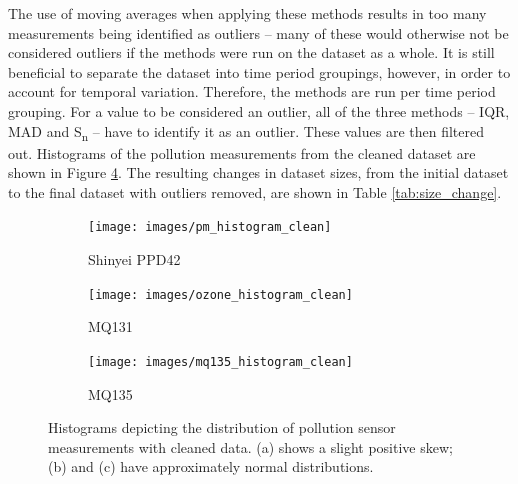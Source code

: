\documentclass[11pt]{report}
\begin{document}
The use of moving averages when applying these methods results in too many measurements being identified as outliers -- many of these would otherwise not be considered outliers if the methods were run on the dataset as a whole. It is still beneficial to separate the dataset into time period groupings, however, in order to account for temporal variation. Therefore, the methods are run per time period grouping. For a value to be considered an outlier, all of the three methods -- IQR, MAD and S\textsubscript{n} -- have to identify it as an outlier. These values are then filtered out. Histograms of the pollution measurements from the cleaned dataset are shown in Figure \ref{fig:histograms_clean}. The resulting changes in dataset sizes, from the initial dataset to the final dataset with outliers removed, are shown in Table \ref{tab:size_change}.

\begin{figure}[!tbp]
    \centering
    \begin{minipage}{1\linewidth}
            \begin{subfigure}[t]{.5\linewidth}
                \texttt{[image: images/pm\_histogram\_clean]}
                \caption{Shinyei PPD42}
                \label{fig:pm_histogram_clean}
            \end{subfigure}
            \begin{subfigure}[t]{.5\linewidth}
            	\texttt{[image: images/ozone\_histogram\_clean]}
            	\caption{MQ131}
            	\label{fig:ozone_histogram_clean}
	   \end{subfigure}
        \end{minipage}
    \begin{minipage}{1\linewidth}
            \begin{subfigure}[t]{.5\linewidth}
                \texttt{[image: images/mq135\_histogram\_clean]}
                \caption{MQ135}
                \label{fig:mq135_histogram_clean}
            \end{subfigure}
    \end{minipage}
    \caption[Sensor measurement histograms with cleaned data.]{Histograms depicting the distribution of pollution sensor measurements with cleaned data. (a) shows a slight positive skew; (b) and (c) have approximately normal distributions.}
    \label{fig:histograms_clean}
\end{figure}
\end{document}
